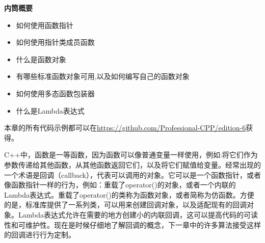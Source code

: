 \noindent
\textbf{内筒概要}

\begin{itemize}
\item
如何使用函数指针

\item
如何使用指针类成员函数

\item
什么是函数对象

\item
有哪些标准函数对象可用,以及如何编写自己的函数对象

\item
如何使用多态函数包装器

\item
什么是Lambda表达式
\end{itemize}

本章的所有代码示例都可以在\url{https://github.com/Professional-CPP/edition-6}获得。

C++中，函数是一等函数，因为函数可以像普通变量一样使用，例如:将它们作为参数传递给其他函数，从其他函数返回它们，以及将它们赋值给变量。经常出现的一个术语是回调（callback），代表可以调用的对象。它可以是一个函数指针，或者像函数指针一样的行为，例如：重载了operator()的对象，或者一个内联的Lambda表达式。重载了operator()的类称为函数对象，或者简称为仿函数。方便的是，标准库提供了一系列类，可以用来创建回调对象，以及适配现有的回调对象。Lambda表达式允许在需要的地方创建小的内联回调，这可以提高代码的可读性和可维护性。现在是时候仔细地了解回调的概念，下一章中的许多算法接受这样的回调进行行为定制。
